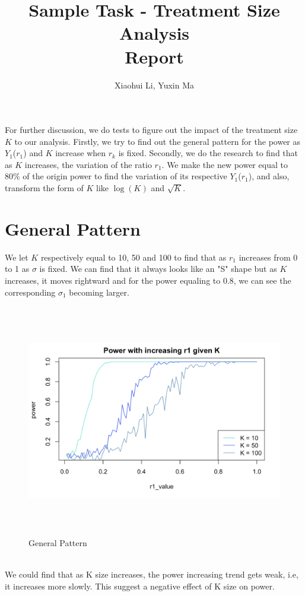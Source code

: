 \documentclass[english]{article}\usepackage{graphicx, color}
\numberwithin{equation}{section}
\numberwithin{figure}{section}
\begin{document}
\title{Sample Task - Treatment Size Analysis\\
Report}


\author{Xiaohui Li, Yuxin Ma}

\maketitle


For further discussion, we do tests to figure out the impact of the treatment size $K$ to our analysis. Firstly, we try to find out the general pattern for the power as $Y_1$($r_1$) and $K$ increase when $r_k$ is fixed. Secondly, we do the research to find that as $K$ increases, the variation of the ratio $r_1$. We make the new power equal to 80\% of the origin power to find the variation of its respective $Y_1$($r_1$), and also, transform the form of $K$ like $\log(K)$ and  $\sqrt{K}$.

\section{General Pattern}
We let $K$ respectively equal to 10, 50 and 100 to find that as $r_1$ increases from 0 to 1 as $\sigma$ is fixed. We can find that it always looks like an "S" shape but as $K$ increases, it moves rightward and for the power equaling to 0.8, we can see the corresponding $\sigma_1$ becoming larger.

\begin{figure}[htbp]
\centering\includegraphics[width=6.5in,height=4in]{pattern}
\caption{General Pattern}
\end{figure}
\quad\\
We could find that as K size increases, the power increasing trend gets weak, i.e, it increases more slowly. This suggest a negative effect of K size on power.
\end{document}

